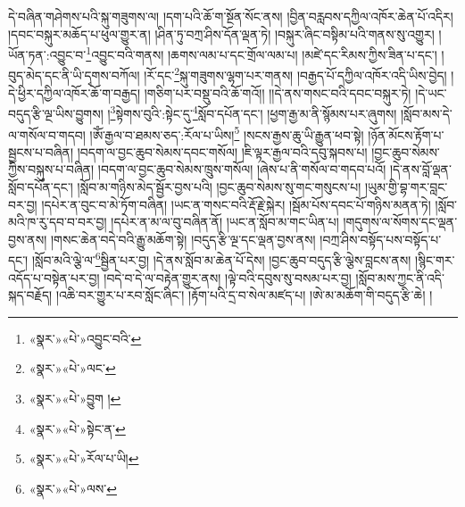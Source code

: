 དེ་བཞིན་གཤེགས་པའི་སྐུ་གཟུགས་ལ། །དག་པའི་ཆོ་ག་སྔོན་སོང་ནས། །བྱིན་བརླབས་དཀྱིལ་འཁོར་ཆེན་པོ་འདིར། །དབང་བསྐུར་མཆོད་པ་ཕུལ་གྱུར་ན། །ཤིན་ཏུ་བཀྲ་ཤིས་དོན་ལྡན་ཏེ། །བསྐུར་ཞིང་བསྟིམ་པའི་གནས་སུ་འགྱུར། །ཡོན་ཏན་:འབྱུང་བ་\footnote{«སྣར་»«པེ་»འབྱུང་བའི་}འབྱུང་བའི་གནས། །ཆགས་ལམ་པ་དང་གྲོལ་ལམ་པ། །མཛེ་དང་རིམས་ཀྱིས་ཟིན་པ་དང་། །བུད་མེད་དང་ནི་ཡི་དྭགས་བཀོལ། །རོ་དང་\footnote{«སྣར་»«པེ་»ལང་}སྐུ་གཟུགས་ལྷག་པར་གནས། །བརྒྱད་པོ་དཀྱིལ་འཁོར་འདི་ཡིས་བྱེད། །དེ་ཕྱིར་དཀྱིལ་འཁོར་ཆོ་ག་བརྒྱད། །གཅིག་པར་བསྡུ་བའི་ཆོ་གའོ།། །།དེ་ནས་གསང་བའི་དབང་བསྐུར་ཏེ། །དེ་ཡང་བདུད་རྩི་ལྔ་ཡིས་བྱུགས། །\footnote{«སྣར་»«པེ་»བྱུག །}སྟེགས་བུའི་:སྟེང་དུ་\footnote{«སྣར་»«པེ་»སྟེང་ན་}སློབ་དཔོན་དང་། །ཕྱག་རྒྱ་མ་ནི་སྙོམས་པར་ཞུགས། །སློབ་མས་དེ་ལ་གསོལ་བ་གདབ། །ཨོཾ་རྒྱལ་བ་ཐམས་ཅད་:རོལ་པ་ཡིས།\footnote{«སྣར་»«པེ་»རོལ་པ་ཡི།} །སངས་རྒྱས་ཆུ་ཡི་རྒྱུན་ཕབ་སྟེ། །ཉོན་མོངས་རྟོག་པ་སྦྱངས་པ་བཞིན། །བདག་ལ་བྱང་ཆུབ་སེམས་དབང་གསོལ། །ཇི་ལྟར་རྒྱལ་བའི་དབུ་སྐབས་པ། །བྱང་ཆུབ་སེམས་ཀྱིས་བསྐུས་པ་བཞིན། །བདག་ལ་བྱང་ཆུབ་སེམས་ཁྲུས་གསོལ། །ཞེས་པ་ནི་གསོལ་བ་གདབ་པའོ། །དེ་ནས་བློ་ལྡན་སློབ་དཔོན་དང་། །སློབ་མ་གཉིས་མེད་སྦྱོར་བྱས་པའི། །བྱང་ཆུབ་སེམས་སུ་གང་གསུངས་པ། །ཡུམ་གྱི་བྷ་གར་བླང་བར་བྱ། །དཔེར་ན་བུང་བ་མེ་ཏོག་བཞིན། །ཡང་ན་གསང་བའི་རྡོ་རྗེ་སྐེར། །སྦོམ་པོས་དབང་པོ་གཉིས་མནན་ཏེ། །སློབ་མའི་ཁ་རུ་དབ་བ་བར་བྱ། །དཔེར་ན་མ་ལ་བུ་བཞིན་ནོ། །ཡང་ན་སློབ་མ་གང་ཡིན་པ། །གདུགས་ལ་སོགས་དང་ལྡན་བྱས་ནས། །གསང་ཆེན་བདེ་བའི་རྒྱུ་མཆོག་སྟེ། །བདུད་རྩི་ལྔ་དང་ལྡན་བྱས་ནས། །བཀྲ་ཤིས་བསྟོད་པས་བསྟོད་པ་དང་། །སློབ་མའི་ལྕེ་ལ་\footnote{«སྣར་»«པེ་»ལས་}སྦྱིན་པར་བྱ། །དེ་ནས་སློབ་མ་ཆེན་པོ་དེས། །བྱང་ཆུབ་བདུད་རྩི་ལྕེས་བླངས་ནས། །སྙིང་གར་འདོད་པ་བསྟེན་པར་བྱ། །བདེ་བ་དེ་ལ་བརྟེན་གྱུར་ནས། །ལྟེ་བའི་དབུས་སུ་བསམ་པར་བྱ། །སློབ་མས་ཀྱང་ནི་འདི་སྐད་བརྗོད། །འཆི་བར་གྱུར་པ་རབ་སློང་ཞིང་། །རྟོག་པའི་དྲ་བ་སེལ་མཛད་པ། །ཨེ་མ་མཆོག་གི་བདུད་རྩི་ཆེ། །
